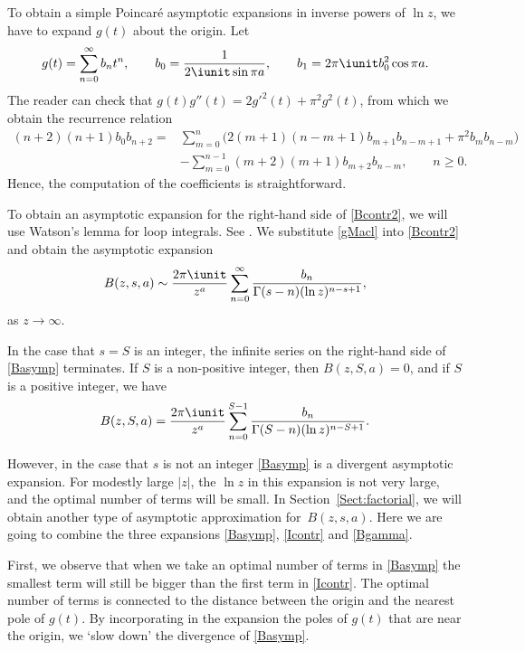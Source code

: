 To obtain a simple Poincar\'e asymptotic expansions in inverse powers of $\ln z$,
we have to expand $g(t)$ about the origin. Let
\begin{gather}\label{gMacl}
 g(t)=\sum_{n=0}^\infty b_nt^n,\qquad b_0=\frac{1}{2\iunit\sin\pi a},\qquad
 b_1=2\pi\iunit b_0^2\cos\pi a.
\end{gather}
The reader can check that $g(t)g''(t)=2g'^2(t)+\pi^2g^2(t)$, from which we obtain the recurrence relation{\samepage
\begin{align*}%
 (n+2)(n+1)b_0b_{n+2}={}&\sum_{m=0}^n\big(2(m+1)(n-m+1)b_{m+1}b_{n-m+1}
 +\pi^2b_m b_{n-m}\big)\\
 &-\sum_{m=0}^{n-1}(m+2)(m+1)b_{m+2}b_{n-m},\qquad n\geq0.
\end{align*}
 Hence, the computation of the coefficients is straightforward.}

To obtain an asymptotic expansion for the right-hand side of \eqref{Bcontr2},
we will use Watson's lemma for loop integrals. See \cite[Section~4.5.3]{Olver1997}.
We substitute \eqref{gMacl} into \eqref{Bcontr2} and obtain the asymptotic expansion
\begin{equation}\label{Basymp}
 B(z,s,a)\sim \frac{2\pi\iunit}{z^{a}}\sum_{n=0}^\infty
 \frac{b_n}{\Gamma(s-n)(\ln z)^{n-s+1}},
\end{equation}
as $z\to\infty$.

In the case that $s=S$ is an integer, the infinite series on the right-hand side
of \eqref{Basymp} terminates.
If $S$ is a non-positive integer, then $B(z,S,a)=0$, and if $S$ is a positive integer,
we have
\begin{gather*}%
 B(z,S,a)= \frac{2\pi\iunit}{z^{a}}\sum_{n=0}^{S-1}
 \frac{b_n}{\Gamma(S-n)(\ln z)^{n-S+1}}.
\end{gather*}

However, in the case that $s$ is not an integer
\eqref{Basymp} is a divergent asymptotic expansion. For modestly large $|z|$, the $\ln z$ in
this expansion is not very large, and the optimal number of terms will be small.
In Section~\ref{Sect:factorial}, we will obtain another type of asymptotic approximation for~$B(z,s,a)$.
Here we are going to combine the three expansions \eqref{Basymp}, \eqref{Icontr} and \eqref{Bgamma}.

First, we observe that when we take an optimal number of terms in \eqref{Basymp} the smallest term will
still be bigger than the first term in \eqref{Icontr}. The optimal number of terms is connected to the
distance between the origin and the nearest pole of $g(t)$. By incorporating in the expansion
the poles of $g(t)$ that are near the origin, we `slow down' the divergence of \eqref{Basymp}.

